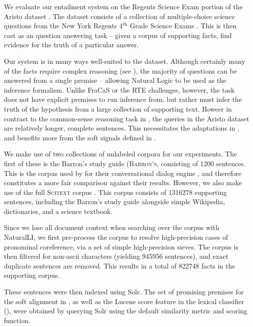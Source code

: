 %
%
We evaluate our entailment system on the Regents Science Exam portion of
  the Aristo dataset \cite{key:2013clark-aristo,key:2015clark-aristo}.
The dataset consists of a collection of multiple-choice science questions
  from the New York Regents 4$^{\textrm{th}}$ Grade Science Exams
  \cite{key:NYSED}.
This is then cast as an question answering task -- given a corpus of
  supporting facts, find evidence for the truth of a particular answer.

Our system is in many ways well-suited to the dataset.
Although certainly many of the facts require complex reasoning
  (see ), the majority of questions can be
  answered from a single premise -- allowing Natural Logic to be used
  as the inference formalism.
Unlike FraCaS or the RTE challenges, however, the task does not have explicit
  premises to run inference from, but rather must infer the truth of the
  hypothesis from a large collection of supporting text.
Howeer in contrast to the common-sense reasoning task in ,
  the queries in the Aristo dataset are relatively longer, complete sentences.
This necessitates the adaptations in , 
  and benefits more from the
  soft signals defined in .

We make use of two collections of unlabeled corpora for our experiments.
The first of these is the Barron's study guide (\textsc{Barron's}, 
  consisting of \num{1200} sentences.
This is the corpus used by  for their conversational
  dialog engine \knowbot, and therefore constitutes a more fair comparison against 
  their results.
However, we also make use of the full \textsc{Scitext} corpus \cite{key:2014clark-aristo}.
This corpus consists of \num{1316278} supporting sentences, 
  including the Barron's study guide alongside 
  simple Wikipedia, dictionaries, and a science textbook.

Since we lose all document context when searching over the corpus with NaturalLI,
  we first pre-process the corpus to resolve high-precision cases of
  pronominal coreference, via a set of simple high-precision sieves.
The corpus is then filtered for non-ascii characters (yielding \num{945956} sentences),
  and exact duplicate sentences are removed.
This results in a total of \num{822748} facts in the supporting corpus.

These sentences were then indexed using Solr.
The set of promising premises for the soft alignment in , as well as
  the Lucene score feature in the lexical classifier (),
  were obtained by querying Solr using the default similarity metric and scoring function.

